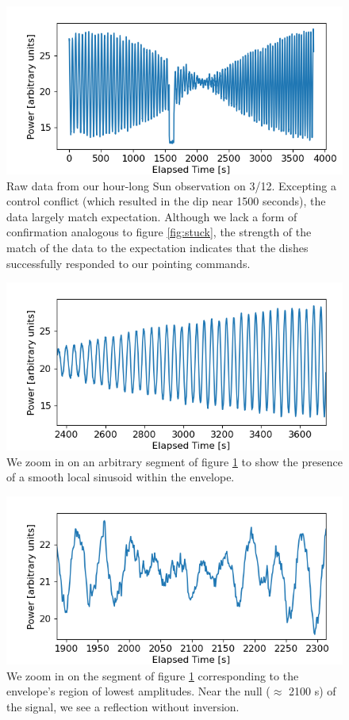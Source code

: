\documentclass[12pt]{article}
\begin{document}
\begin{figure}
	\centering
	\includegraphics[width=.6\linewidth]{envelope/Sun_hour}
	\caption{Raw data from our hour-long Sun observation on 3/12. Excepting a control conflict (which resulted in the dip near 1500 seconds), the data largely match expectation. Although we lack a form of confirmation analogous to figure \ref{fig:stuck}, the strength of the match of the data to the expectation indicates that the dishes successfully responded to our pointing commands.}
	\label{fig:Sun_envelope}
\end{figure}

\begin{figure}
	\centering
	\includegraphics[width=.6\linewidth]{sinusoid/Sun_hour}
	\caption{We zoom in on an arbitrary segment of figure \ref{fig:Sun_envelope} to show the presence of a smooth local sinusoid within the envelope.}
	\label{fig:Sun_sinusoid}
\end{figure}

\begin{figure}
	\centering
	\includegraphics[width=.6\linewidth]{null}
	\caption{We zoom in on the segment of figure \ref{fig:Sun_envelope} corresponding to the envelope's region of lowest amplitudes. Near the null ($\approx$ 2100 s) of the signal, we see a reflection without inversion.}
	\label{fig:Sun_null}
\end{figure}
\end{document}
